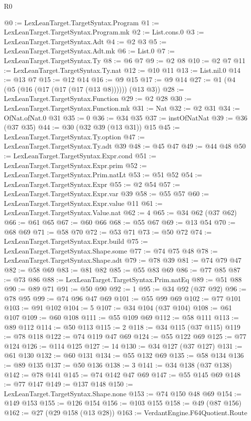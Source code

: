 \begin{lexlean}{R0}
\begin{coremodule}
@0 := LexLeanTarget.TargetSyntax.Program
@1 := LexLeanTarget.TargetSyntax.Program.mk
@2 := List.cons.{0}
@3 := LexLeanTarget.TargetSyntax.Adt
@4 := @2 @3
@5 := LexLeanTarget.TargetSyntax.Adt.mk
@6 := List.{0}
@7 := LexLeanTarget.TargetSyntax.Ty
@8 := @6 @7
@9 := @2 @8
@10 := @2 @7
@11 := LexLeanTarget.TargetSyntax.Ty.nat
@12 := @10 @11
@13 := List.nil.{0}
@14 := @13 @7
@15 := @12 @14
@16 := @9 @15
@17 := @9 @14
@27 := @1 (@4 (@5 (@16 (@17 (@17 (@17 (@13 @8)))))) (@13 @3))
@28 := LexLeanTarget.TargetSyntax.Function
@29 := @2 @28
@30 := LexLeanTarget.TargetSyntax.Function.mk
@31 := Nat
@32 := @2 @31
@34 := OfNat.ofNat.{0} @31
@35 := 0
@36 := @34 @35
@37 := instOfNatNat
@39 := @36 (@37 @35)
@44 := @30 (@32 @39 (@13 @31)) @15
@45 := LexLeanTarget.TargetSyntax.Ty.option
@47 := LexLeanTarget.TargetSyntax.Ty.adt @39
@48 := @45 @47
@49 := @44 @48
@50 := LexLeanTarget.TargetSyntax.Expr.cond
@51 := LexLeanTarget.TargetSyntax.Expr.prim
@52 := LexLeanTarget.TargetSyntax.Prim.natLt
@53 := @51 @52
@54 := LexLeanTarget.TargetSyntax.Expr
@55 := @2 @54
@57 := LexLeanTarget.TargetSyntax.Expr.var @39
@58 := @55 @57
@60 := LexLeanTarget.TargetSyntax.Expr.value @11
@61 := LexLeanTarget.TargetSyntax.Value.nat
@62 := 4
@65 := @34 @62 (@37 @62)
@66 := @61 @65
@67 := @60 @66
@68 := @55 @67
@69 := @13 @54
@70 := @68 @69
@71 := @58 @70
@72 := @53 @71
@73 := @50 @72
@74 := LexLeanTarget.TargetSyntax.Expr.build
@75 := LexLeanTarget.TargetSyntax.Shape.some
@77 := @74 @75 @48
@78 := LexLeanTarget.TargetSyntax.Shape.adt
@79 := @78 @39
@81 := @74 @79 @47
@82 := @58 @69
@83 := @81 @82
@85 := @55 @83 @69
@86 := @77 @85
@87 := @73 @86
@88 := LexLeanTarget.TargetSyntax.Prim.natEq
@89 := @51 @88
@90 := @89 @71
@91 := @50 @90
@92 := 1
@95 := @34 @92 (@37 @92)
@96 := @78 @95
@99 := @74 @96 @47 @69
@101 := @55 @99 @69
@102 := @77 @101
@103 := @91 @102
@104 := 5
@107 := @34 @104 (@37 @104)
@108 := @61 @107
@109 := @60 @108
@111 := @55 @109 @69
@112 := @58 @111
@113 := @89 @112
@114 := @50 @113
@115 := 2
@118 := @34 @115 (@37 @115)
@119 := @78 @118
@122 := @74 @119 @47 @69
@124 := @55 @122 @69
@125 := @77 @124
@126 := @114 @125
@127 := 14
@130 := @34 @127 (@37 @127)
@131 := @61 @130
@132 := @60 @131
@134 := @55 @132 @69
@135 := @58 @134
@136 := @89 @135
@137 := @50 @136
@138 := 3
@141 := @34 @138 (@37 @138)
@142 := @78 @141
@145 := @74 @142 @47 @69
@147 := @55 @145 @69
@148 := @77 @147
@149 := @137 @148
@150 := LexLeanTarget.TargetSyntax.Shape.none
@153 := @74 @150 @48 @69
@154 := @149 @153
@155 := @126 @154
@156 := @103 @155
@158 := @49 (@87 @156)
@162 := @27 (@29 @158 (@13 @28))
@163 := VerdantEngine.F64Quotient.Route

\end{coremodule}
\end{lexlean}
